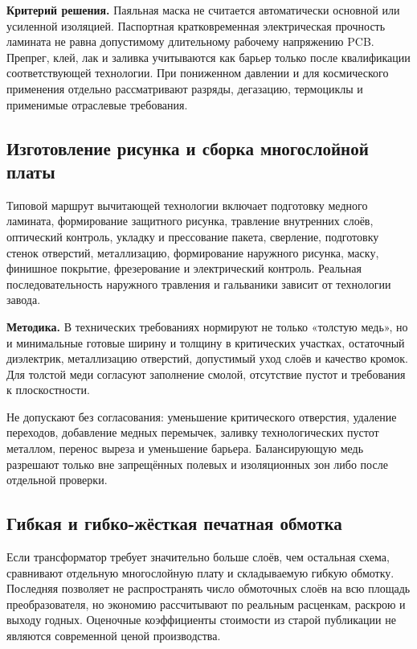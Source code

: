 \documentclass[14pt,a4paper]{extarticle}
\newcommand{\method}{\par\noindent\textbf{Методика.} }
\newcommand{\criterion}{\par\noindent\textbf{Критерий решения.} }
\begin{document}
\criterion Паяльная маска не считается автоматически основной или усиленной изоляцией. Паспортная кратковременная электрическая прочность ламината не равна допустимому длительному рабочему напряжению PCB. Препрег, клей, лак и заливка учитываются как барьер только после квалификации соответствующей технологии. При пониженном давлении и для космического применения отдельно рассматривают разряды, дегазацию, термоциклы и применимые отраслевые требования.

\subsection{Изготовление рисунка и сборка многослойной платы}
Типовой маршрут вычитающей технологии включает подготовку медного ламината, формирование защитного рисунка, травление внутренних слоёв, оптический контроль, укладку и прессование пакета, сверление, подготовку стенок отверстий, металлизацию, формирование наружного рисунка, маску, финишное покрытие, фрезерование и электрический контроль. Реальная последовательность наружного травления и гальваники зависит от технологии завода.\cite{web16,web17,web18,web22}

\method В технических требованиях нормируют не только «толстую медь», но и минимальные готовые ширину и толщину в критических участках, остаточный диэлектрик, металлизацию отверстий, допустимый уход слоёв и качество кромок. Для толстой меди согласуют заполнение смолой, отсутствие пустот и требования к плоскостности.

Не допускают без согласования: уменьшение критического отверстия, удаление переходов, добавление медных перемычек, заливку технологических пустот металлом, перенос выреза и уменьшение барьера. Балансирующую медь разрешают только вне запрещённых полевых и изоляционных зон либо после отдельной проверки.

\subsection{Гибкая и гибко-жёсткая печатная обмотка}
Если трансформатор требует значительно больше слоёв, чем остальная схема, сравнивают отдельную многослойную плату и складываемую гибкую обмотку. Последняя позволяет не распространять число обмоточных слоёв на всю площадь преобразователя, но экономию рассчитывают по реальным расценкам, раскрою и выходу годных. Оценочные коэффициенты стоимости из старой публикации не являются современной ценой производства.\cite[раздел II]{doi54}
\end{document}
